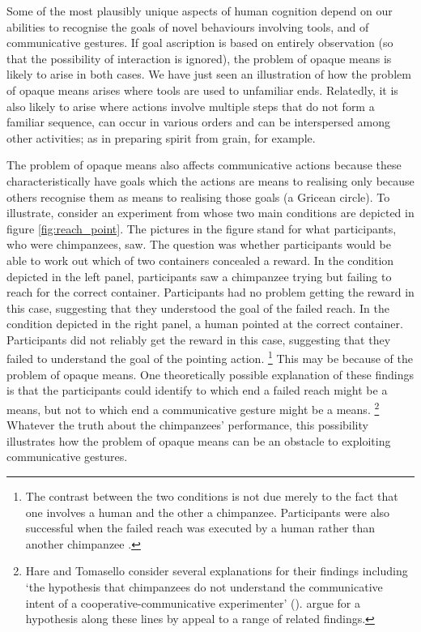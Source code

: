 \documentclass[14pt,a4paper]{extarticle}
\begin{document}
Some of the most plausibly unique aspects of human cognition depend on our abilities to recognise the goals of novel behaviours involving tools, and of communicative gestures.
If goal ascription is based on entirely observation 
(so that the possibility of interaction is ignored),
the problem of opaque means is likely to arise in both cases.
We have just seen an illustration of how the problem of opaque means arises where tools are used to unfamiliar ends.
Relatedly, it is also likely to arise where actions involve multiple steps that do not form a familiar sequence, can occur in various orders and can be interspersed among other activities;
as in preparing spirit from grain, for example.

The problem of opaque means also affects communicative actions 
 because these characteristically have  goals which the actions are means to realising only because others recognise them as means to realising those goals (a Gricean circle). 
To illustrate, consider an experiment from 
\citet[][experiment 3]{hare_chimpanzees_2004}
 whose two main conditions are depicted in figure \vref{fig:reach_point}.
The pictures in the figure stand for what participants, who were chimpanzees, saw.
The question was whether participants would be able to work out which of two containers concealed a reward.
In the condition depicted in the left panel, participants saw a chimpanzee trying but failing to reach for the correct container. 
Participants had no problem getting the reward in this case, suggesting that they understood the goal of the failed reach.
In the condition depicted in the right panel, a human pointed at the correct container.
Participants did not reliably  get the reward in this case, suggesting that they failed to understand the goal of the pointing action.%
\footnote{
The contrast between the two conditions is not due merely to the fact that one involves a human and the other a chimpanzee.
Participants were also successful when the failed reach was executed by a human rather than another chimpanzee \citep[][experiment 1]{hare_chimpanzees_2004}. 
}
This may be because of the problem of opaque means.
One theoretically possible explanation of these findings is that the participants could identify to which end a failed reach might be a means, but not to which end a communicative gesture might be a means.%
\footnote{
  \label{fn:communicative_intention}
Hare and Tomasello 
consider several explanations for their findings including `the hypothesis that chimpanzees do not understand the communicative intent of a cooperative-communicative experimenter' (\citeyear[p.\ 580]{hare_chimpanzees_2004}).
\citet[pp.\ 5--7]{Moll:2007gu} argue for a hypothesis along these lines by appeal to a range of related findings.
}
Whatever the truth about the chimpanzees' performance,
this possibility illustrates how the problem of opaque means can be an obstacle to exploiting communicative gestures.
\end{document}
